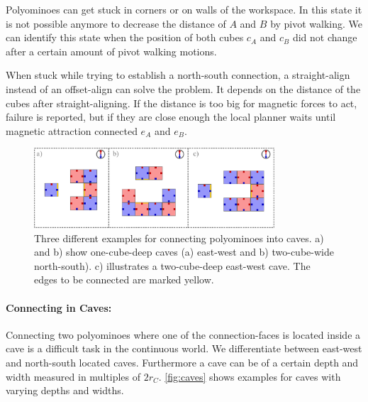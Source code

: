 Polyominoes can get stuck in corners or on walls of the workspace.
In this state it is not possible anymore to decrease the distance of $A$ and $B$ by pivot walking.
We can identify this state when the position of both cubes $c_A$ and $c_B$ did not change after a certain amount of pivot walking motions.

When stuck while trying to establish a north-south connection, a straight-align instead of an offset-align can solve the problem.
It depends on the distance of the cubes after straight-aligning.
If the distance is too big for magnetic forces to act, failure is reported, but if they are close enough the local planner waits until magnetic attraction connected $e_A$ and $e_B$.


\begin{figure}
	\centering
	\includegraphics[width=0.80\textwidth]{figures/caves.pdf}
	\caption[Examples for connecting polyominoes into caves]{Three different examples for connecting polyominoes into caves. a) and b) show one-cube-deep caves (a) east-west and b) two-cube-wide north-south). c) illustrates a two-cube-deep east-west cave. The edges to be connected are marked yellow.}
	\label{fig:caves}
\end{figure}

\paragraph{Connecting in Caves:}

Connecting two polyominoes where one of the connection-faces is located inside a cave is a difficult task in the continuous world.
We differentiate between east-west and north-south located caves.
Furthermore a cave can be of a certain depth and width measured in multiples of $2 r_C$.
\autoref{fig:caves} shows examples for caves with varying depths and widths.

